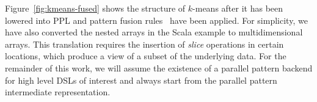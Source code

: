 Figure~\ref{fig:kmeans-fused} shows the structure of $k$-means after it has been lowered into PPL and
pattern fusion rules~\cite{rompf12optimizing} have been applied.
For simplicity, we have also converted the nested arrays in the Scala example to multidimensional arrays.
This translation requires the insertion of \emph{slice} operations in certain locations, which produce a view of a subset of the underlying data.
For the remainder of this work, we will assume the existence of a parallel pattern backend
for high level DSLs of interest and always start from the parallel pattern intermediate representation.

%
